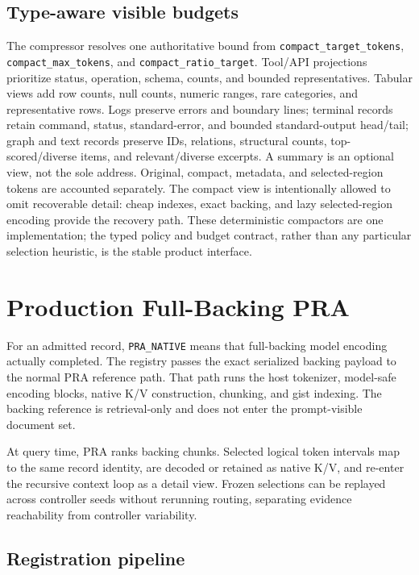 \documentclass[11pt]{article}
\begin{document}
\subsection{Type-aware visible budgets}

The compressor resolves one authoritative bound from
\texttt{compact\_target\_tokens}, \texttt{compact\_max\_tokens}, and
\texttt{compact\_ratio\_target}. Tool/API projections prioritize status,
operation, schema, counts, and bounded representatives. Tabular views add row
counts, null counts, numeric ranges, rare categories, and representative rows.
Logs preserve errors and boundary lines; terminal records retain command,
status, standard-error, and bounded standard-output head/tail; graph and text
records preserve IDs, relations, structural counts, top-scored/diverse items,
and relevant/diverse excerpts. A summary is an optional view, not the sole
address. Original, compact,
metadata, and selected-region tokens are accounted separately. The compact
view is intentionally allowed to omit recoverable detail: cheap indexes, exact
backing, and lazy selected-region encoding provide the recovery path. These
deterministic compactors are one implementation; the typed policy and budget
contract, rather than any particular selection heuristic, is the stable
product interface.

\section{Production Full-Backing PRA}

For an admitted record, \texttt{PRA\_NATIVE} means that full-backing model
encoding actually completed. The registry passes the exact serialized backing
payload to the normal PRA reference path. That path runs the host tokenizer,
model-safe encoding blocks, native K/V construction, chunking, and gist
indexing. The backing reference is retrieval-only and does not enter the
prompt-visible document set.

At query time, PRA ranks backing chunks. Selected logical token intervals map
to the same record identity, are decoded or retained as native K/V, and re-enter
the recursive context loop as a detail view. Frozen selections can be replayed
across controller seeds without rerunning routing, separating evidence
reachability from controller variability.

\subsection{Registration pipeline}
\end{document}
